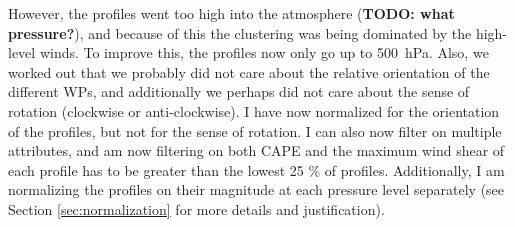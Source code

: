 \documentclass{article}
\newcommand\todo[1]{\textbf{TODO: #1}}
\begin{document}
However, the profiles went too high into the atmosphere (\todo{what pressure?}), and because of this the clustering was being dominated by the high-level winds. To improve this, the profiles now only go up to \SI{500}{hPa}. Also, we worked out that we probably did not care about the relative orientation of the different WPs, and additionally we perhaps did not care about the sense of rotation (clockwise or anti-clockwise). I have now normalized for the orientation of the profiles, but not for the sense of rotation. I can also now filter on multiple attributes, and am now filtering on both CAPE and the maximum wind shear of each profile has to be greater than the lowest 25 \% of profiles. Additionally, I am normalizing the profiles on their magnitude at each pressure level separately (see Section \ref{sec:normalization} for more details and justification).
\end{document}
